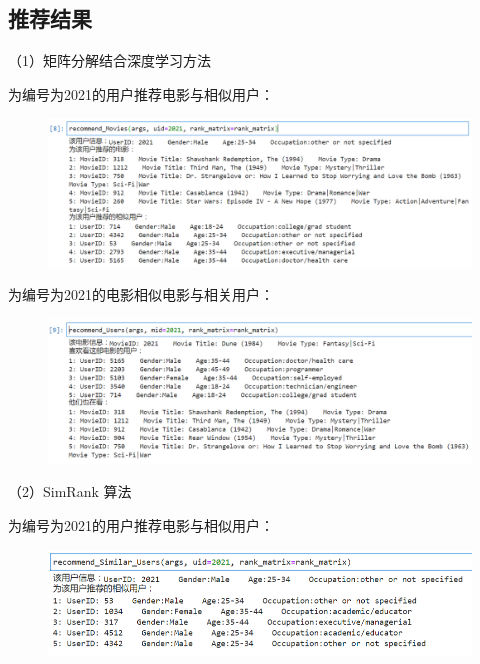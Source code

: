 \subsection{推荐结果}
\xiaosi\begin{spacing}{1.5}
（1）矩阵分解结合深度学习方法\par
为编号为2021的用户推荐电影与相似用户：\par
\clearpage
\begin{figure}[h]
\setlength{\abovecaptionskip}{0.0cm}
\setlength{\belowcaptionskip}{-0.cm}
\centering
\includegraphics[width=1\textwidth]{Figure/dl1.png}
\end{figure}\par
\par
为编号为2021的电影相似电影与相关用户：
\begin{figure}[h]
\setlength{\abovecaptionskip}{0.0cm}
\setlength{\belowcaptionskip}{-0.cm}
\centering
\includegraphics[width=1\textwidth]{Figure/dl2.png}
\end{figure}\par
\par
（2）SimRank 算法\par
为编号为2021的用户推荐电影与相似用户：\par
\begin{figure}[h]
\setlength{\abovecaptionskip}{0.0cm}
\setlength{\belowcaptionskip}{-0.cm}
\centering
\includegraphics[width=1\textwidth]{Figure/svd1.png}

\end{figure}
\end{spacing}
